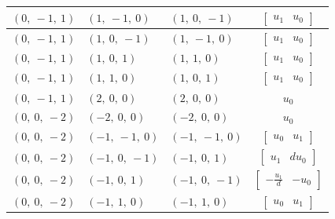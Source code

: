 \documentclass[11pt]{article}
\theoremstyle{definition}
\begin{document}
\begin{longtable}{|l|l|l|c|}
    \hline
    $\left( 0, \  -1, \  1\right)$ & $\left( 1, \  -1, \  0\right)$ & $\left( 1, \  0, \  -1\right)$ & $\left[\begin{matrix}u_{1} & u_{0}\end{matrix}\right]$ \\
    \hline
    $\left( 0, \  -1, \  1\right)$ & $\left( 1, \  0, \  -1\right)$ & $\left( 1, \  -1, \  0\right)$ & $\left[\begin{matrix}u_{1} & u_{0}\end{matrix}\right]$ \\
    \hline
    $\left( 0, \  -1, \  1\right)$ & $\left( 1, \  0, \  1\right)$ & $\left( 1, \  1, \  0\right)$ & $\left[\begin{matrix}u_{1} & u_{0}\end{matrix}\right]$ \\
    \hline
    $\left( 0, \  -1, \  1\right)$ & $\left( 1, \  1, \  0\right)$ & $\left( 1, \  0, \  1\right)$ & $\left[\begin{matrix}u_{1} & u_{0}\end{matrix}\right]$ \\
    \hline
    $\left( 0, \  -1, \  1\right)$ & $\left( 2, \  0, \  0\right)$ & $\left( 2, \  0, \  0\right)$ & $u_{0}$ \\
    \hline
    $\left( 0, \  0, \  -2\right)$ & $\left( -2, \  0, \  0\right)$ & $\left( -2, \  0, \  0\right)$ & $u_{0}$ \\
    \hline
    $\left( 0, \  0, \  -2\right)$ & $\left( -1, \  -1, \  0\right)$ & $\left( -1, \  -1, \  0\right)$ & $\left[\begin{matrix}u_{0} & u_{1}\end{matrix}\right]$ \\
    \hline
    $\left( 0, \  0, \  -2\right)$ & $\left( -1, \  0, \  -1\right)$ & $\left( -1, \  0, \  1\right)$ & $\left[\begin{matrix}u_{1} & d u_{0}\end{matrix}\right]$ \\
    \hline
    $\left( 0, \  0, \  -2\right)$ & $\left( -1, \  0, \  1\right)$ & $\left( -1, \  0, \  -1\right)$ & $\left[\begin{matrix}- \frac{u_{1}}{d} & - u_{0}\end{matrix}\right]$ \\
    \hline
    $\left( 0, \  0, \  -2\right)$ & $\left( -1, \  1, \  0\right)$ & $\left( -1, \  1, \  0\right)$ & $\left[\begin{matrix}u_{0} & u_{1}\end{matrix}\right]$ \\

\end{longtable}
\end{document}

